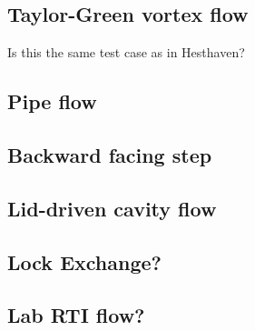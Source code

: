\subsection{Taylor-Green vortex flow}
Is this the same test case as in Hesthaven?

\subsection{Pipe flow}
\subsection{Backward facing step}

\subsection{Lid-driven cavity flow}

\subsection{Lock Exchange?}
\subsection{Lab RTI flow?}

